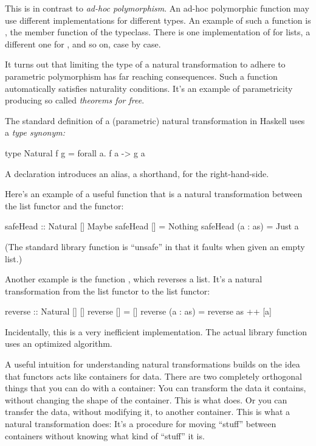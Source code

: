 \documentclass[DaoFP]{subfiles}
\begin{document}
This is in contrast to \emph{ad-hoc polymorphism}. An ad-hoc polymorphic function may use different implementations for different types. An example of such a function is , the member function of the  typeclass. There is one implementation of  for lists, a different one for , and so on, case by case. 

It turns out that limiting the type of a natural transformation to adhere to parametric polymorphism has far reaching consequences. Such a function automatically satisfies naturality conditions. It's an example of parametricity producing so called \emph{theorems for free}. 

The standard definition of a (parametric) natural transformation in Haskell uses a \emph{type synonym:}
\begin{haskell}
type Natural f g = forall a. f a -> g a
\end{haskell}
A  declaration introduces an alias, a shorthand, for the right-hand-side.

Here's an example of a useful function that is a natural transformation between the list functor and the  functor:
\begin{haskell}
safeHead :: Natural [] Maybe
safeHead [] = Nothing
safeHead (a : as) = Just a
\end{haskell}
(The standard library  function is ``unsafe'' in that it faults when given an empty list.)

Another example is the function , which reverses a list. It's a natural transformation from the list functor to the list functor:
\begin{haskell}
reverse :: Natural [] []
reverse [] = []
reverse (a : as) = reverse as ++ [a]
\end{haskell}
Incidentally, this is a very inefficient implementation. The actual library function uses an optimized algorithm.

A useful intuition for understanding natural transformations builds on the idea that functors acts like containers for data. There are two completely orthogonal things that you can do with a container: You can transform the data it contains, without changing the shape of the container. This is what  does. Or you can transfer the data, without modifying it, to another container. This is what a natural transformation does: It's a procedure for moving ``stuff'' between containers without knowing what kind of ``stuff'' it is. 
\end{document}
